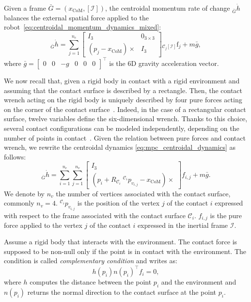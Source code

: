 Given a frame $\bar{G} = (x_\text{CoM},[\mathcal{I}])$, the centroidal momentum rate of change ${}_{\bar{G}} \dot{h}$ balances the external spatial force applied to the robot~\eqref{eq:centroidal_momentum_dynamics_mixed}:
\begin{equation}
    \label{eq:mpc_centroidal_dynamics}
    {}_{\bar{G}} \dot{{h}} = \sum_{j = 1}^{n_c} \begin{bmatrix}
	I_3 & {0}_{3\times 3} \\
	\left({p}_j - {x}_\text{CoM}\right)\times & I_3 
	\end{bmatrix} {}_{\mathcal{C}_j[\mathcal{I}]}\mathrm{f}_j + m \bar{g},
\end{equation}
where $\bar{g} = \begin{bmatrix} 0&0&-g&0&0&0 \end{bmatrix}^\top$ is the 6D gravity acceleration vector.
\par
We now recall that, given a rigid body in contact with a rigid environment and assuming that the contact surface is described by a rectangle. Then, the contact wrench acting on the rigid body is uniquely described by four pure forces acting on the corner of the contact surface~\citep{Caron2015StabilityAreas}. Indeed, in the case of a rectangular contact surface, twelve variables define the six-dimensional wrench. Thanks to this choice, several contact configurations can be modeled independently, depending on the number of points in contact~\citep{Dafarra2020Whole-BodyApproach,dai2014whole}. Given the relation between pure forces and contact wrench, we rewrite the centroidal dynamics \eqref{eq:mpc_centroidal_dynamics} as follows:
\begin{equation}
 	{}_{\bar{G}} \dot{h} = \sum_{i = 1}^{n_c} \sum_{j = 1}^{n_v} \begin{bmatrix}
       I_3 \\
       (p_{i} + R _{\mathcal{C} _ {i} } \; {}^{\mathcal{C}_i}  p_{v_{i,j}} - x_{\text{CoM}})\times
     \end{bmatrix} f_{i,j} + m\bar{g}.
     \label{eq:centroidal_dynamics}
\end{equation}
We denote by $n_v$ the number of vertices associated with the contact surface, commonly $n_v = 4$. ${}^{\mathcal{C}_i} p_{v_{i,j}}$ is the position of the vertex $j$ of the contact $i$ expressed with respect to the frame associated with the contact surface $\mathcal{C}_i$. $f_{i,j}$ is the pure force applied to the vertex $j$ of the contact $i$ expressed in the inertial frame $\mathcal{I}$.
\par
Assume a rigid body that interacts with the environment. The contact force is supposed to be non-null only if the point is in contact with the environment. The condition is called \emph{complementary condition} and writes as:
\begin{equation}
    h(p_{i})n(p_{i})^\top f_i = 0,
    \label{eq:complementary_condition}
\end{equation}
where $h$ computes the distance between the point $p_{i}$ and the environment and $n(p_{i})$ returns the normal direction to the contact surface at the point $p_{i}$. 


